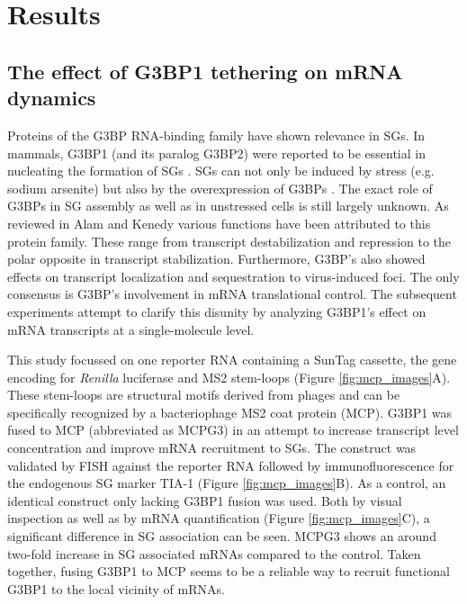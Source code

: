 \chapter{Results}


\section{The effect of G3BP1 tethering on mRNA dynamics}

Proteins of the G3BP RNA-binding family have shown relevance in SGs.
In mammals, G3BP1 (and its paralog G3BP2) were reported to be essential in nucleating the formation of SGs \cite{kedersha_g3bp-caprin1-usp10_2016}.
SGs can not only be induced by stress (e.g. sodium arsenite) but also by the overexpression of G3BPs \cite{tourriere_rasgap-associated_2003}.
The exact role of G3BPs in SG assembly as well as in unstressed cells is still largely unknown.
As reviewed in Alam and Kenedy \cite{alam_rasputin_2019} various functions have been attributed to this protein family.
These range from transcript destabilization and repression to the polar opposite in transcript stabilization.
Furthermore, G3BP's also showed effects on transcript localization and sequestration to
    virus-induced foci.
The only consensus is G3BP's involvement in mRNA translational control.
The subsequent experiments attempt to clarify this disunity by analyzing G3BP1's effect on mRNA transcripts at a single-molecule level.

This study focussed on one reporter RNA containing a SunTag cassette, the gene encoding for \textit{Renilla} luciferase and MS2 stem-loops (Figure \ref{fig:mcp_images}A).
These stem-loops are structural motifs derived from phages and can be specifically recognized by a bacteriophage MS2 coat protein (MCP).
G3BP1 was fused to MCP (abbreviated as MCPG3) in an attempt to increase transcript level concentration and improve mRNA recruitment to SGs.
The construct was validated by FISH against the reporter RNA followed by immunofluorescence for the endogenous SG marker TIA-1 \cite{kedersha_rna-binding_1999} (Figure \ref{fig:mcp_images}B).
As a control, an identical construct only lacking G3BP1 fusion was used.
Both by visual inspection as well as by mRNA quantification (Figure \ref{fig:mcp_images}C), a significant difference in SG association can be seen.
MCPG3 shows an around two-fold increase in SG associated mRNAs compared to the control.
Taken together, fusing G3BP1 to MCP seems to be a reliable way to recruit functional G3BP1 to the local vicinity of mRNAs.

